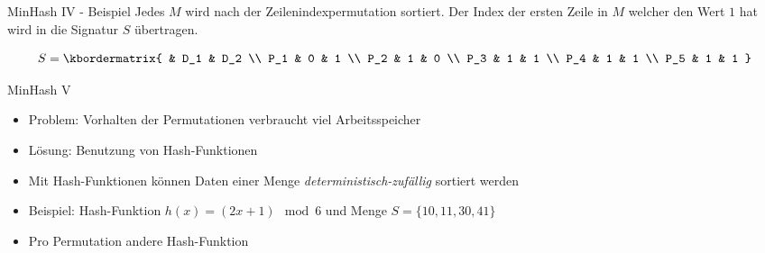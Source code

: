 \begin{frame}{MinHash IV - Beispiel}
    Jedes $ M $ wird nach der Zeilenindexpermutation sortiert. Der Index der ersten Zeile in $ M $ welcher den Wert $ 1 $ hat wird in die Signatur $ S $ übertragen. \pause


    \begin{example}
        \begin{equation*}
            S = 
            \kbordermatrix{
                & D_1 & D_2 \\
                P_1 & 0 & 1 \\
                P_2 & 1 & 0 \\
                P_3 & 1 & 1 \\
                P_4 & 1 & 1 \\
                P_5 & 1 & 1
            }
        \end{equation*}
    \end{example}
\end{frame}

\begin{frame}{MinHash V}
    \begin{itemize}
        \item Problem: Vorhalten der Permutationen verbraucht viel Arbeitsspeicher \pause
        \item Lösung: Benutzung von Hash-Funktionen \pause
        \item Mit Hash-Funktionen können Daten einer Menge \textit{deterministisch-zufällig} sortiert werden \pause
        \item Beispiel: Hash-Funktion $ h(x) = (2x+1) \mod 6 $ und Menge $ S = \{ 10,11,30,41 \} $ \pause
        \item Pro Permutation andere Hash-Funktion
    \end{itemize}
\end{frame}

